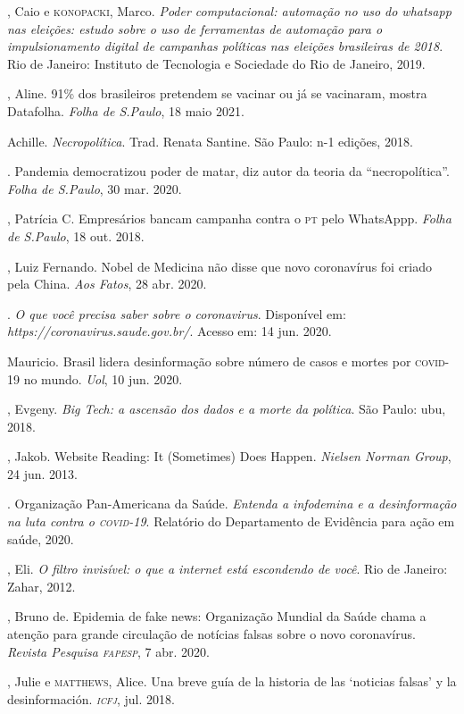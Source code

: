 \begin{bibliohedra}
, Caio e \textsc{konopacki}, Marco. \textit{Poder computacional: automação
no uso do whatsapp nas eleições: estudo sobre o uso de ferramentas de
automação para o impulsionamento digital de campanhas políticas nas
eleições brasileiras de 2018}. Rio de Janeiro: Instituto de Tecnologia e Sociedade do Rio de Janeiro, 2019.

, Aline. 91\% dos brasileiros pretendem se vacinar ou já se vacinaram, mostra Datafolha. \textit{Folha de S.Paulo}, 18 maio 2021.

 Achille. \textit{Necropolítica}. Trad. Renata Santine. São Paulo: n-1 edições, 2018.

\titidem. Pandemia democratizou poder de matar, diz autor
da teoria da ``necropolítica''. \textit{Folha de S.Paulo}, 30 mar. 2020.

, Patrícia C. Empresários bancam campanha contra o \textsc{pt} pelo
WhatsAppp. \textit{Folha de S.Paulo}, 18 out. 2018.

, Luiz Fernando. Nobel de Medicina não disse que novo
coronavírus foi criado pela China. \textit{Aos Fatos}, 28 abr. 2020.

. \textit{O que você precisa saber sobre o
coronavirus}. Disponível em: \textit{https://coronavirus.saude.gov.br/}.
Acesso em: 14 jun. 2020.

 Mauricio. Brasil lidera desinformação sobre número de
casos e mortes por \textsc{covid-19} no mundo. \textit{Uol}, 10 jun. 2020.

, Evgeny. \textit{Big Tech: a ascensão dos dados e a
morte da política}. São Paulo: ubu, 2018.

, Jakob. Website Reading: It (Sometimes) Does Happen. \textit{Nielsen Norman Group}, 24 jun. 2013. 

. Organização Pan-Americana da Saúde. \textit{Entenda a infodemina e a desinformação na luta contra o \textsc{covid-19}}. Relatório do Departamento de Evidência para ação em saúde, 2020.

, Eli. \textit{O filtro invisível: o que a internet está
escondendo de você}. Rio de Janeiro: Zahar, 2012.

, Bruno de.
Epidemia de fake news: Organização Mundial da Saúde chama a
atenção para grande circulação de notícias falsas sobre o novo
coronavírus. \textit{Revista Pesquisa \textsc{fapesp}}, 7 abr. 2020.

, Julie e \textsc{matthews}, Alice. Una breve guía de la historia
de las `noticias falsas' y la desinformación. \textit{\textsc{icfj}}, jul. 2018.


\end{bibliohedra}

